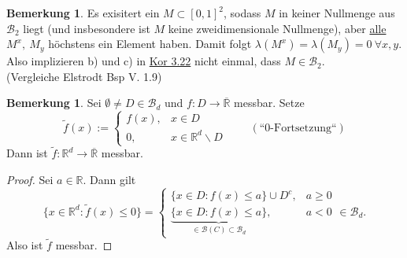 \documentclass[a4paper]{report}
\newcommand{\R}{\mathbb{R}}
\newcommand{\Rq}{\overline{\R}}
\newcommand{\Borel}{\mathcal{B}}
\newcommand{\Bd}{\Borel_d}
\newcommand{\jlabel}[1]{\label{j_#1}}
\newcommand{\jhyperref}[2]{\hyperref[j_#1]{#2}}
\newcommand{\jlink}[1]{\jhyperref{#1}{#1}}
\newcommand{\jabb}[3]{ #1: #2 \rightarrow #3 }
\theoremstyle{plain}
\theoremstyle{definition}
\newtheorem{bem}[thm]{Bemerkung}
\begin{document}
{{{{\begin{bem}
\jlabel{Bem 3.23}
    Es exisitert ein $M\subset [0,1]^2$, sodass $M$ in keiner Nullmenge aus $\Borel_2$ liegt (und insbesondere ist $M$ keine zweidimensionale Nullmenge), aber \uline{alle} $M^x,\ M_y$ höchstens ein Element haben. Damit folgt $\lambda(M^x) = \lambda(M_y) = 0 \ \forall x,y$.\\
    Also implizieren b) und c) in \jlink{Kor 3.22} nicht einmal, dass $M\in\Borel_2$.\\
    (Vergleiche Elstrodt Bsp V. 1.9)
\end{bem}


\begin{bem}
\jlabel{Bem 3.24}
    Sei $\emptyset \ne D\in \Bd$ und $\jabb{f}{D}{\Rq}$ messbar. Setze
    \begin{displaymath}
        \tilde{f}(x) := \begin{cases} f(x), &x\in D\\ 0, &x\in \R^d\backslash D \end{cases} \hspace{25pt} (\text{``0-Fortsetzung``})
    \end{displaymath}
    Dann ist $\jabb{\tilde{f}}{\R^d}{\Rq}$ messbar.
    \begin{proof}
        Sei $a\in \R$. Dann gilt
        \begin{displaymath}
            \{x\in \R^d : \tilde{f}(x) \le 0\} = \begin{cases} \{x\in D : f(x) \le a\} \cup D^c, &a\ge 0\\ \underbrace{\{x\in D: f(x)\le a\}}_{\in\Borel(C) \subset \Bd}, &a < 0 \end{cases} \in \Bd.
        \end{displaymath}
        Also ist $\tilde{f}$ messbar.
    \end{proof}
\end{bem}


}}}}
\end{document}
